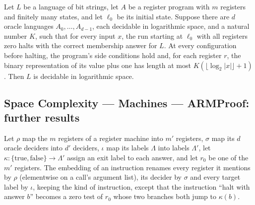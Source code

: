 \begin{theorem}
\label{Complexity.LogProg.arm_decides}
\leanok
{}
Let $L$ be a language of bit strings, let $A$ be a register program with $m$ registers
and finitely many states, and let $\ell_0$ be its initial state. Suppose there are $d$
oracle languages $A_0,\ldots,A_{d-1}$, each decidable in logarithmic space, and a
natural number $K$, such that for every input $x$, the run starting at $\ell_0$ with all
registers zero halts with the correct membership answer for $L$. At every configuration
before halting, the program's side conditions hold and, for each register $r$, the
binary representation of its value plus one has length at most $K(\lfloor\log_2
|x|\rfloor+1)$. Then $L$ is decidable in logarithmic space.
\end{theorem}

\subsection*{Space Complexity --- Machines --- ARMProof: further results}

\begin{definition}
\label{Complexity.LogProg.Ins.embed}
\leanok
{}
Let $\rho$ map the $m$ registers of a register machine into $m'$ registers, $\sigma$ map its
$d$ oracle deciders into $d'$ deciders, $\iota$ map its labels $\Lambda$ into labels
$\Lambda'$, let $\kappa:\{\mathrm{true},\mathrm{false}\}\to\Lambda'$ assign an exit label to
each answer, and let $r_0$ be one of the $m'$ registers. The embedding of an instruction
renames every register it mentions by $\rho$ (elementwise on a call's argument list), its
decider by $\sigma$ and every target label by $\iota$, keeping the kind of instruction, except
that the instruction ``halt with answer $b$'' becomes a zero test of $r_0$ whose two branches
both jump to $\kappa(b)$.
\end{definition}

